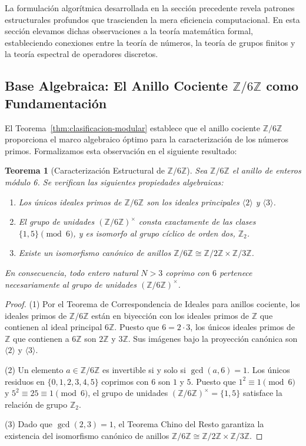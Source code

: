 \documentclass{article}
\numberwithin{equation}{section}
\newcommand{\ZZ}{\mathbb{Z}}
\theoremstyle{plain}
\newtheorem{theorem}{Teorema}[section]
\theoremstyle{definition}
\begin{document}
La formulación algorítmica desarrollada en la sección precedente revela patrones estructurales profundos que trascienden la mera eficiencia computacional. En esta sección elevamos dichas observaciones a la teoría matemática formal, estableciendo conexiones entre la teoría de números, la teoría de grupos finitos y la teoría espectral de operadores discretos.

\subsection{Base Algebraica: El Anillo Cociente $\ZZ/6\ZZ$ como Fundamentación}

El Teorema~\ref{thm:clasificacion-modular} establece que el anillo cociente $\ZZ/6\ZZ$ proporciona el marco algebraico óptimo para la caracterización de los números primos. Formalizamos esta observación en el siguiente resultado:

\begin{theorem}[Caracterización Estructural de $\ZZ/6\ZZ$]
\label{thm:caracterizacion-primos-Z6}
Sea $\ZZ/6\ZZ$ el anillo de enteros módulo 6. Se verifican las siguientes propiedades algebraicas:
\begin{enumerate}
    \item Los únicos ideales primos de $\ZZ/6\ZZ$ son los ideales principales $\langle 2 \rangle$ y $\langle 3 \rangle$.
    \item El grupo de unidades $(\ZZ/6\ZZ)^\times$ consta exactamente de las clases $\{1, 5\} \pmod 6$, y es isomorfo al grupo cíclico de orden dos, $\ZZ_2$.
    \item Existe un isomorfismo canónico de anillos $\ZZ/6\ZZ \cong \ZZ/2\ZZ \times \ZZ/3\ZZ$.
\end{enumerate}
En consecuencia, todo entero natural $N > 3$ coprimo con $6$ pertenece necesariamente al grupo de unidades $(\ZZ/6\ZZ)^\times$.
\end{theorem}

\begin{proof}
(1) Por el Teorema de Correspondencia de Ideales para anillos cociente, los ideales primos de $\ZZ/6\ZZ$ están en biyección con los ideales primos de $\ZZ$ que contienen al ideal principal $6\ZZ$. Puesto que $6 = 2 \cdot 3$, los únicos ideales primos de $\ZZ$ que contienen a $6\ZZ$ son $2\ZZ$ y $3\ZZ$. Sus imágenes bajo la proyección canónica son $\langle 2 \rangle$ y $\langle 3 \rangle$.

(2) Un elemento $a \in \ZZ/6\ZZ$ es invertible si y solo si $\gcd(a, 6) = 1$. Los únicos residuos en $\{0, 1, 2, 3, 4, 5\}$ coprimos con $6$ son $1$ y $5$. Puesto que $1^2 \equiv 1 \pmod 6$ y $5^2 \equiv 25 \equiv 1 \pmod 6$, el grupo de unidades $(\ZZ/6\ZZ)^\times = \{1, 5\}$ satisface la relación de grupo $\ZZ_2$.

(3) Dado que $\gcd(2, 3) = 1$, el Teorema Chino del Resto garantiza la existencia del isomorfismo canónico de anillos $\ZZ/6\ZZ \cong \ZZ/2\ZZ \times \ZZ/3\ZZ$.
\end{proof}
\end{document}
